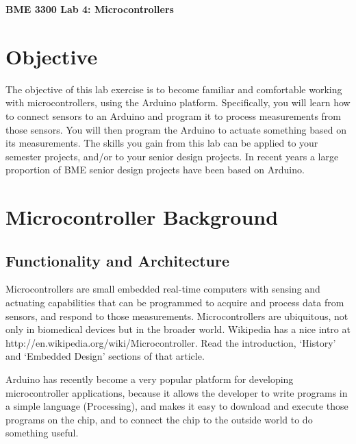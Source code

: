 \documentclass[12pt]{article}
\begin{document}
\thispagestyle{plain} %





\begin{center}

\textbf{BME 3300 Lab 4: Microcontrollers} \medskip

\end{center}

\section*{Objective} The objective of this lab exercise is to become familiar and comfortable working with
microcontrollers, using the Arduino platform. 
Specifically, you will learn how to connect sensors to an Arduino and program it to process measurements
from those sensors. 
You will then program the Arduino to actuate something based on its measurements.
The skills you gain from this lab can be applied to your semester projects, and/or to your senior design projects.
In recent years a large proportion of BME senior design projects have been based on Arduino. 

\section*{Microcontroller Background}
\subsection*{Functionality and Architecture}
Microcontrollers are small embedded real-time computers with sensing and actuating capabilities
that can be programmed to acquire and process data from sensors, and respond to those measurements.
Microcontrollers are ubiquitous, not only in biomedical devices but in the broader world. 
Wikipedia has a nice intro at http://en.wikipedia.org/wiki/Microcontroller.
Read the introduction, `History' and `Embedded Design' sections of that article.
\par Arduino has recently become a very popular platform for developing microcontroller applications, because it allows the developer
to write programs in a simple language (Processing), and makes it easy to download and execute those
programs on the chip, and to connect the chip to the outside world to do something useful. 
\end{document}
